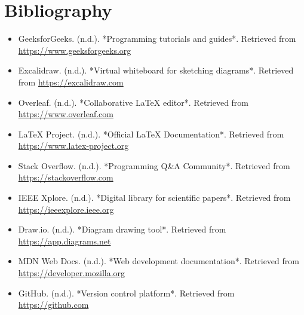 \chapter*{Bibliography}

\begin{itemize}
  \item GeeksforGeeks. (n.d.). *Programming tutorials and guides*. Retrieved from \url{https://www.geeksforgeeks.org}
  \item Excalidraw. (n.d.). *Virtual whiteboard for sketching diagrams*. Retrieved from \url{https://excalidraw.com}
  \item Overleaf. (n.d.). *Collaborative LaTeX editor*. Retrieved from \url{https://www.overleaf.com}
  \item LaTeX Project. (n.d.). *Official LaTeX Documentation*. Retrieved from \url{https://www.latex-project.org}
  \item Stack Overflow. (n.d.). *Programming Q\&A Community*. Retrieved from \url{https://stackoverflow.com}
  \item IEEE Xplore. (n.d.). *Digital library for scientific papers*. Retrieved from \url{https://ieeexplore.ieee.org}
  \item Draw.io. (n.d.). *Diagram drawing tool*. Retrieved from \url{https://app.diagrams.net}
  \item MDN Web Docs. (n.d.). *Web development documentation*. Retrieved from \url{https://developer.mozilla.org}
  \item GitHub. (n.d.). *Version control platform*. Retrieved from \url{https://github.com}
\end{itemize}

